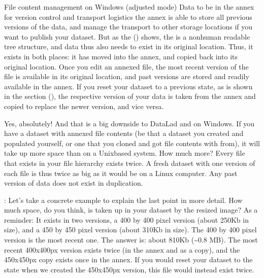 \begin{windowswit}[label={ww-adjusted-mode}, before title={\thetcbcounter\ }, float, floatplacement=tbp, check odd page=true]{File content management on Windows (adjusted mode)}
\sphinxAtStartPar
{}
Data  to be in the annex for version control and transport logistics \textendash{} the annex is able to store all previous versions of the data, and manage the transport to other storage locations if you want to publish your dataset.
But as the {\hyperref[\detokenize{basics/101-115-symlinks:fom-objecttree}]{}} () shows, the {\hyperref[\detokenize{glossary:term-annex}]{}} is a non\sphinxhyphen{}human readable tree structure, and data thus also needs to exist in its original location.
Thus, it exists in both places: it has moved into the annex, and copied back into its original location.
Once you edit an annexed file, the most recent version of the file is available in its original location, and past versions are stored and readily available in the annex.
If you reset your dataset to a previous state, as is shown in the section {\hyperref[\detokenize{basics/101-137-history:history}]{}} (), the respective version of your data is taken from the annex and copied to replace the newer version, and vice versa.

\sphinxAtStartPar
{}
Yes, absolutely!
And that is a big downside to DataLad and {\hyperref[\detokenize{glossary:term-git-annex}]{}} on Windows.
If you have a dataset with annexed file contents (be that a dataset you created and populated yourself, or one that you cloned and got file contents with  from), it will take up more space than on a Unix\sphinxhyphen{}based system.
How much more?
Every file that exists in your file hierarchy exists twice.
A fresh dataset with one version of each file is thus twice as big as it would be on a Linux computer.
Any past version of data does not exist in duplication.

\sphinxAtStartPar
{}:
Let’s take a concrete example to explain the last point in more detail.
How much space, do you think, is taken up in your dataset by the resized  image?
As a reminder: It exists in two versions, a 400 by 400 pixel version (about 250Kb in size), and a 450 by 450 pixel version (about 310Kb in size).
The 400 by 400 pixel version is the most recent one.
The answer is: about 810Kb (\textasciitilde{}0.8 MB).
The most recent 400x400px version exists twice (in the annex and as a copy), and the 450x450px copy exists once in the annex.
If you would reset your dataset to the state when we created the 450x450px version, this file would instead exist twice.


\end{windowswit}
